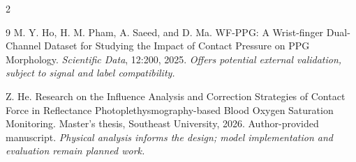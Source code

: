 \documentclass[10pt]{article}
\begin{document}
\begin{multicols*}{2}
\begin{thebibliography}{9}
M. Y. Ho, H. M. Pham, A. Saeed, and D. Ma.
WF-PPG: A Wrist-finger Dual-Channel Dataset for Studying the Impact of Contact Pressure on PPG Morphology.
\textit{Scientific Data}, 12:200, 2025.
\textit{Offers potential external validation, subject to signal and label compatibility.}

Z. He.
Research on the Influence Analysis and Correction Strategies of Contact Force in Reflectance Photoplethysmography-based Blood Oxygen Saturation Monitoring.
Master's thesis, Southeast University, 2026. Author-provided manuscript.
\textit{Physical analysis informs the design; model implementation and evaluation remain planned work.}
\end{thebibliography}
\end{multicols*}
\end{document}
